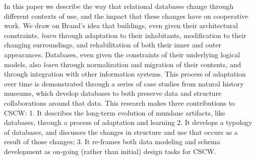 In this paper we describe the way that relational databases change through different contexts of use, and the impact that these changes have on cooperative work. We draw on Brand's idea that buildings, even given their architectural constraints, \emph{learn} through adaptation to their inhabitants, modification to their changing surroundings, and rehabilitation of both their inner and outer appearances. Databases, even given the constraints of their underlying logical models, also \emph{learn} through normalization and migration of their contents, and through integration with other information systems. This process of adaptation over time is demonstrated through a series of case studies from natural history museums, which develop databases to both preserve data and structure collaborations around that data. This research makes three contributions to CSCW: 1. It describes the long-term evolution of mundane artifacts, like databases, through a process of adaptation and learning 2. It develops a typology of databases, and discusses the changes in structure and use that occurs as a result of those changes; 3. It re-frames both data modeling and schema development as on-going (rather than initial) design tasks for CSCW.